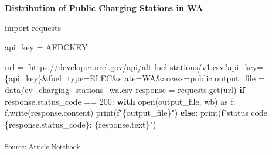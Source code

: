 \documentclass[
  letterpaper,
  DIV=11,
  numbers=noendperiod]{scrartcl}
\newenvironment{Shaded}{\begin{snugshade}}{\end{snugshade}}
\newcommand{\BuiltInTok}[1]{\textcolor[rgb]{0.00,0.23,0.31}{#1}}
\newcommand{\ControlFlowTok}[1]{\textcolor[rgb]{0.00,0.23,0.31}{\textbf{#1}}}
\newcommand{\DecValTok}[1]{\textcolor[rgb]{0.68,0.00,0.00}{#1}}
\newcommand{\ImportTok}[1]{\textcolor[rgb]{0.00,0.46,0.62}{#1}}
\newcommand{\NormalTok}[1]{\textcolor[rgb]{0.00,0.23,0.31}{#1}}
\newcommand{\OperatorTok}[1]{\textcolor[rgb]{0.37,0.37,0.37}{#1}}
\newcommand{\SpecialCharTok}[1]{\textcolor[rgb]{0.37,0.37,0.37}{#1}}
\newcommand{\SpecialStringTok}[1]{\textcolor[rgb]{0.13,0.47,0.30}{#1}}
\newcommand{\StringTok}[1]{\textcolor[rgb]{0.13,0.47,0.30}{#1}}
\begin{document}
\begin{tcolorbox}[enhanced jigsaw, colframe=quarto-callout-note-color-frame, toprule=.15mm, arc=.35mm, breakable, leftrule=.75mm, bottomrule=.15mm, colback=white, rightrule=.15mm, left=2mm, opacityback=0]
\begin{minipage}[t]{5.5mm}
\textcolor{quarto-callout-note-color}{\faInfo}
\end{minipage}%
\begin{minipage}[t]{\textwidth - 5.5mm}

\vspace{-3mm}\textbf{Distribution of Public Charging Stations in WA}\vspace{3mm}

\begin{Shaded}
\begin{Highlighting}[]
\ImportTok{import}\NormalTok{ requests}

\NormalTok{api\_key }\OperatorTok{=}\NormalTok{ AFDCKEY}

\NormalTok{url }\OperatorTok{=} \SpecialStringTok{f\textquotesingle{}https://developer.nrel.gov/api/alt{-}fuel{-}stations/v1.csv?api\_key=}\SpecialCharTok{\{}\NormalTok{api\_key}\SpecialCharTok{\}}\SpecialStringTok{\&fuel\_type=ELEC\&state=WA\&access=public\textquotesingle{}}
\NormalTok{output\_file }\OperatorTok{=} \StringTok{\textquotesingle{}data/ev\_charging\_stations\_wa.csv\textquotesingle{}}
\NormalTok{response }\OperatorTok{=}\NormalTok{ requests.get(url)}
\ControlFlowTok{if}\NormalTok{ response.status\_code }\OperatorTok{==} \DecValTok{200}\NormalTok{:}
    \ControlFlowTok{with} \BuiltInTok{open}\NormalTok{(output\_file, }\StringTok{\textquotesingle{}wb\textquotesingle{}}\NormalTok{) }\ImportTok{as}\NormalTok{ f:}
\NormalTok{        f.write(response.content)}
    \BuiltInTok{print}\NormalTok{(}\SpecialStringTok{f"}\SpecialCharTok{\{}\NormalTok{output\_file}\SpecialCharTok{\}}\SpecialStringTok{"}\NormalTok{)}
\ControlFlowTok{else}\NormalTok{:}
    \BuiltInTok{print}\NormalTok{(}\SpecialStringTok{f"status code }\SpecialCharTok{\{}\NormalTok{response}\SpecialCharTok{.}\NormalTok{status\_code}\SpecialCharTok{\}}\SpecialStringTok{: }\SpecialCharTok{\{}\NormalTok{response}\SpecialCharTok{.}\NormalTok{text}\SpecialCharTok{\}}\SpecialStringTok{"}\NormalTok{)}
\end{Highlighting}
\end{Shaded}

\textsubscript{Source:
\href{https://h-christy.github.io/24-manuscript/index.qmd.html}{Article
Notebook}}


\end{minipage}
\end{tcolorbox}
\end{document}
